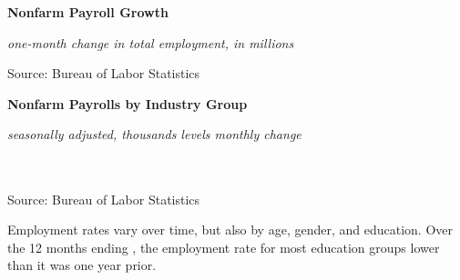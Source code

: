 \documentclass{report}
\newcommand{\tbllink}[1]{\href{https://raw.githubusercontent.com/bdecon/US-chartbook/master/chartbook/data/#1}{\faTable}}
\newcommand{\ctsbar}[5]{
		\addplot[ybar stacked, bar width=#5, draw opacity=0, fill=#1] 
			table [x=#2, y=#3, col sep=comma]{#4};}
\newcommand{\dateaxisticks}{
		date coordinates in=x, axis line style={draw=none},
		xmax={2020-08-10},
		max space between ticks=40,	    
		xtick={{1990-01-01}, {1992-01-01}, {1994-01-01}, 
			{1996-01-01}, {1998-01-01}, {2000-01-01}, 
			{2002-01-01}, {2004-01-01}, {2006-01-01},
			{2008-01-01}, {2010-01-01}, {2012-01-01}, {2014-01-01},
		    {2016-01-01}, {2018-01-01}, {2020-01-01}},
		minor xtick={{1989-01-01}, {1991-01-01}, {1993-01-01},
			{1995-01-01}, {1997-01-01}, {1999-01-01}, 
			{2001-01-01}, {2003-01-01}, {2005-01-01}, {2007-01-01},
		    {2009-01-01}, {2011-01-01}, {2013-01-01}, {2015-01-01},
		    {2017-01-01}, {2019-01-01}},
		enlarge y limits={0.06}, enlarge x limits={0.01},
		}
\newcommand{\bbar}[2]{extra #1 ticks = {{#2}}, extra #1 tick labels = ,
		extra #1 tick style = {grid=major, grid style={thick, black!25}},}
\begin{document}
{{{{{{\begin{minipage}{0.46\textwidth}
\normalsize \textbf{Nonfarm Payroll Growth}

\footnotesize{\textit{one-month change in total employment, in millions}}

\hspace*{-3mm} 

\footnotesize{Source: Bureau of Labor Statistics} \hfill \tbllink{nfp.csv}
\end{minipage}

\vspace{6mm}

\normalsize \textbf{Nonfarm Payrolls by Industry Group}\\
\footnotesize{\textit{seasonally adjusted, thousands \hspace{14mm}levels \hspace{17mm} monthly change}\\
\vspace{-5mm}

\hspace*{-3mm} \noindent {} \setlength{\tabcolsep}{3.1pt} \color{black!90}
		{\renewcommand{\arraystretch}{1.55}
		 \begin{tabular}{p{39.5mm} R{10.5mm} R{10.5mm} R{9.6mm} R{9.6mm} R{9.6mm} 
		   R{9.6mm} R{9.6mm} }
			 \hline
		\end{tabular}
		}	\\
		
\vspace{-2mm}
\footnotesize{Source: Bureau of Labor Statistics} \hspace{7.1cm} \tbllink{ces_data.csv}

\newpage
\begin{minipage}{0.76\textwidth} 
\small Employment rates vary over time, but also by age, gender, and education. Over the 12 months ending , the employment rate for most education groups lower than it was one year prior.

\vspace{5mm}


\end{minipage}}}}}}}}
\end{document}
